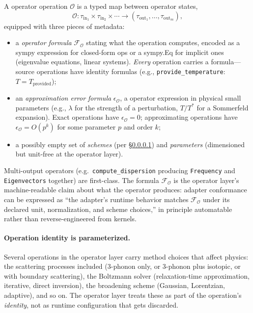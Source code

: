 \documentclass[11pt,a4paper]{article}
\begin{document}
A operator operation $\mathcal{O}$ is a typed map between operator states,
\begin{equation}
  \mathcal{O} : \tau_{\text{in}_1} \times \tau_{\text{in}_2} \times \cdots \to (\tau_{\text{out}_1}, \ldots, \tau_{\text{out}_m}),
\end{equation}
equipped with three pieces of metadata:
\begin{itemize}[leftmargin=2em]
  \item a \emph{operator formula} $\mathcal{F}_\mathcal{O}$ stating what the operation
        computes, encoded as a sympy expression for closed-form ops or a sympy.Eq for
        implicit ones (eigenvalue equations, linear systems). \emph{Every} operation
        carries a formula---source operations have identity formulas (e.g.,
        \texttt{provide\_temperature}: $T = T_{\text{provided}}$);
  \item an \emph{approximation error formula} $\epsilon_{\mathcal{O}}$, a operator
        expression in physical small parameters (e.g., $\lambda$ for the strength of a
        perturbation, $T/T^*$ for a Sommerfeld expansion). Exact operations have
        $\epsilon_{\mathcal{O}} = 0$; approximating operations have
        $\epsilon_{\mathcal{O}} = O(p^k)$ for some parameter $p$ and order $k$;
  \item a possibly empty set of \emph{schemes} (per
        \S\ref{ssec:parameterized-operation-identity}) and \emph{parameters}
        (dimensioned but unit-free at the operator layer).
\end{itemize}
Multi-output operators (e.g.\ \texttt{compute\_dispersion} producing
\texttt{Frequency} and \texttt{Eigenvectors} together) are first-class. The formula
$\mathcal{F}_\mathcal{O}$ is the operator layer's machine-readable claim about what the
operator produces: adapter conformance can be expressed as ``the adapter's runtime
behavior matches $\mathcal{F}_\mathcal{O}$ under its declared unit, normalization,
and scheme choices,'' in principle automatable rather than reverse-engineered
from kernels.


\paragraph{Operation identity is parameterized.}\label{ssec:parameterized-operation-identity}

Several operations in the operator layer carry method choices that affect physics: the scattering
processes included (3-phonon only, or 3-phonon plus isotopic, or with boundary scattering), the
Boltzmann solver (relaxation-time approximation, iterative, direct inversion), the broadening
scheme (Gaussian, Lorentzian, adaptive), and so on. The operator layer treats these as part of the
operation's \emph{identity}, not as runtime configuration that gets discarded.
\end{document}
